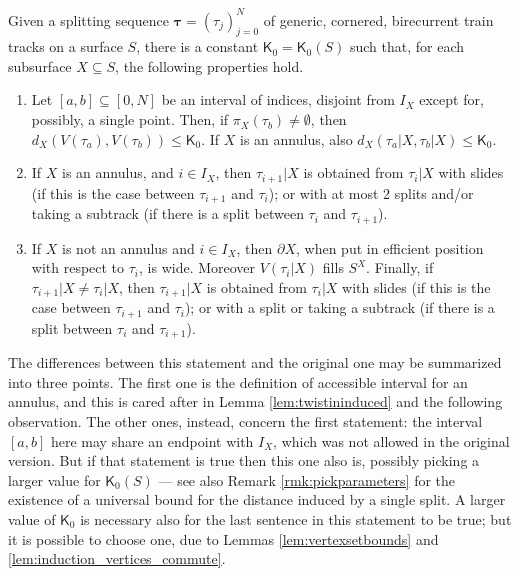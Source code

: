 \begin{theo}\label{thm:mmsstructure}
Given a splitting sequence $\bm\tau=(\tau_j)_{j=0}^N$ of generic, cornered, birecurrent train tracks on a surface $S$, there is a constant $\mathsf K_0=\mathsf K_0(S)$ such that, for each subsurface $X\subseteq S$, the following properties hold.

\begin{enumerate}
\item Let $[a,b]\subseteq [0,N]$ be an interval of indices, disjoint from $I_X$ except for, possibly, a single point. Then, if $\pi_X(\tau_b)\not=\emptyset$, then $d_X(V(\tau_a),V(\tau_b))\leq \mathsf K_0$. If $X$ is an annulus, also $d_X(\tau_a|X,\tau_b|X)\leq \mathsf K_0$.
\item If $X$ is an annulus, and $i\in I_X$, then $\tau_{i+1}|X$ is obtained from $\tau_i|X$ with slides (if this is the case between $\tau_{i+1}$ and $\tau_i$); or with at most 2 splits and/or taking a subtrack (if there is a split between $\tau_{i}$ and $\tau_{i+1}$).
\item If $X$ is not an annulus and $i\in I_X$, then $\partial X$, when put in efficient position with respect to $\tau_i$, is wide. Moreover $V(\tau_i|X)$ fills $S^X$. Finally, if $\tau_{i+1}|X\not=\tau_i|X$, then $\tau_{i+1}|X$ is obtained from $\tau_i|X$ with slides (if this is the case between $\tau_{i+1}$ and $\tau_i$); or with a split or taking a subtrack (if there is a split between $\tau_{i}$ and $\tau_{i+1}$).
\end{enumerate}
\end{theo}

The differences between this statement and the original one may be summarized into three points. The first one is the definition of accessible interval for an annulus, and this is cared after in Lemma \ref{lem:twistininduced} and the following observation. The other ones, instead, concern the first statement: the interval $[a,b]$ here may share an endpoint with $I_X$, which was not allowed in the original version. But if that statement is true then this one also is, possibly picking a larger value for $\mathsf K_0(S)$ --- see also Remark \ref{rmk:pickparameters} for the existence of a universal bound for the distance induced by a single split. A larger value of $\mathsf K_0$ is necessary also for the last sentence in this statement to be true; but it is possible to choose one, due to Lemmas \ref{lem:vertexsetbounds} and \ref{lem:induction_vertices_commute}.

